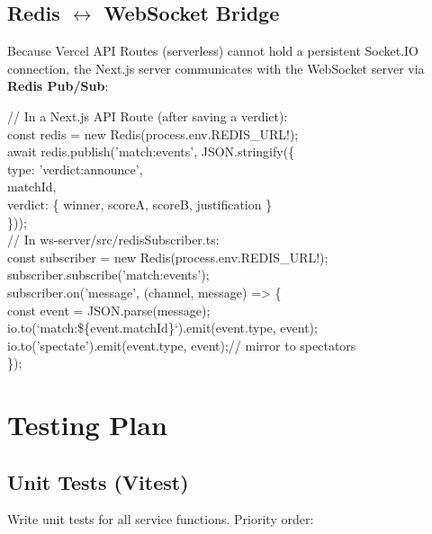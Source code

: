 \documentclass[11pt, a4paper]{article}
\begin{document}
\subsection{Redis $\leftrightarrow$ WebSocket Bridge}

Because Vercel API Routes (serverless) cannot hold a persistent Socket.IO connection, the Next.js server communicates with the WebSocket server via \textbf{Redis Pub/Sub}:

\begin{tcolorbox}[codebox]
\small\color{white}\ttfamily
\textcolor{codegreen}{// In a Next.js API Route (after saving a verdict):}\\
const redis = new Redis(process.env.REDIS\_URL!);\\
await redis.publish('match:events', JSON.stringify(\{\\
\quad type: 'verdict:announce',\\
\quad matchId,\\
\quad verdict: \{ winner, scoreA, scoreB, justification \}\\
\}));\\[0.3em]
\textcolor{codegreen}{// In ws-server/src/redisSubscriber.ts:}\\
const subscriber = new Redis(process.env.REDIS\_URL!);\\
subscriber.subscribe('match:events');\\
subscriber.on('message', (channel, message) => \{\\
\quad const event = JSON.parse(message);\\
\quad io.to(`match:\$\{event.matchId\}`).emit(event.type, event);\\
\quad io.to('spectate').emit(event.type, event);\quad\textcolor{codegreen}{// mirror to spectators}\\
\});
\end{tcolorbox}

\section{Testing Plan}

\subsection{Unit Tests (Vitest)}

Write unit tests for all service functions. Priority order:
\end{document}
